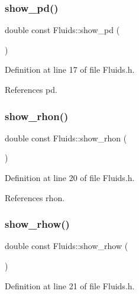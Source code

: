 \subsubsection{\texorpdfstring{show\+\_\+pd()}{show\_pd()}}
{\footnotesize\ttfamily double const Fluids\+::show\+\_\+pd (\begin{DoxyParamCaption}{ }\end{DoxyParamCaption})\hspace{0.3cm}{\ttfamily [inline]}}



Definition at line 17 of file Fluids.\+h.



References pd.

\mbox{\label{classFluids_a1cd1ff51be0e735425bb00e470ed3cbc}} 
\subsubsection{\texorpdfstring{show\+\_\+rhon()}{show\_rhon()}}
{\footnotesize\ttfamily double const Fluids\+::show\+\_\+rhon (\begin{DoxyParamCaption}{ }\end{DoxyParamCaption})\hspace{0.3cm}{\ttfamily [inline]}}



Definition at line 20 of file Fluids.\+h.



References rhon.

\mbox{\label{classFluids_abc729002dd8045a86a24727d1fa69a12}} 
\subsubsection{\texorpdfstring{show\+\_\+rhow()}{show\_rhow()}}
{\footnotesize\ttfamily double const Fluids\+::show\+\_\+rhow (\begin{DoxyParamCaption}{ }\end{DoxyParamCaption})\hspace{0.3cm}{\ttfamily [inline]}}



Definition at line 21 of file Fluids.\+h.



